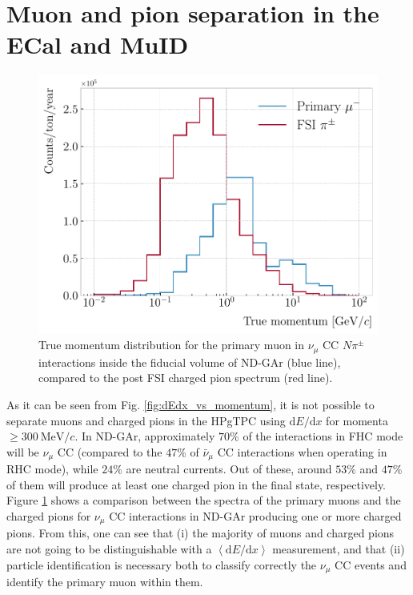 \section{Muon and pion separation in the ECal and MuID}\label{section:muon_bdt}

\begin{figure}[t]
	\centering
	\includegraphics[width=.70\linewidth]{Images/GArSoft_PID/BDT/ndgar_fhc_numu_cc_mu_spectrum.pdf}
	\caption[True momentum distributions for the primary muon and the post FSI charged pions in $\nu_{\mu}$ CC $N\pi^{\pm}$ interactions inside ND-GAr.]{True momentum distribution for the primary muon in $\nu_{\mu}$ CC $N\pi^{\pm}$ interactions inside the fiducial volume of ND-GAr (blue line), compared to the post FSI charged pion spectrum (red line).}
	\label{fig:primary_muon_spectrum}
\end{figure}

As it can be seen from Fig. \ref{fig:dEdx_vs_momentum}, it is not possible to separate muons and charged pions in the HPgTPC using $\mathrm{d}E/\mathrm{d}x$ for momenta $\geq 300~\mathrm{MeV}/c$. In ND-GAr, approximately $70\%$ of the interactions in FHC mode will be $\nu_{\mu}$ CC (compared to the $47\%$ of $\bar{\nu}_{\mu}$ CC interactions when operating in RHC mode), while $24\%$ are neutral currents. Out of these, around $53\%$ and $47\%$ of them will produce at least one charged pion in the final state, respectively. Figure \ref{fig:primary_muon_spectrum} shows a comparison between the spectra of the primary muons and the charged pions for $\nu_{\mu}$ CC interactions in ND-GAr producing one or more charged pions. From this, one can see that (i) the majority of muons and charged pions are not going to be distinguishable with a $\left<\mathrm{d}E/\mathrm{d}x\right>$ measurement, and that (ii) particle identification is necessary both to classify correctly the $\nu_{\mu}$ CC events and identify the primary muon within them.

